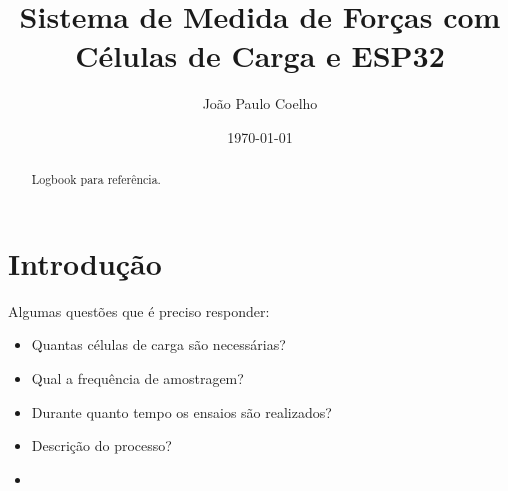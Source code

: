 \documentclass{article}
\begin{document}
\title{Sistema de Medida de Forças com Células de Carga e ESP32}
\author{João Paulo Coelho}
\date{\today}
\maketitle

\begin{abstract}
    Logbook para referência. 
\end{abstract}

\tableofcontents

\section{Introdução}

Algumas questões que é preciso responder:
\begin{itemize}
\item 
Quantas células de carga são necessárias?
\item
Qual a frequência de amostragem?
\item
Durante quanto tempo os ensaios são realizados?
\item 
Descrição do processo?
\item

\end{itemize}
\end{document}
